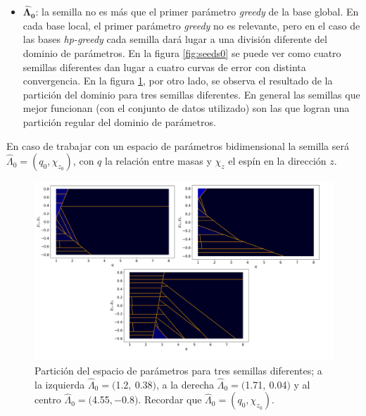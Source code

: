 \begin{itemize}
\item $\bm{\hat{\Lambda}_0}$: la semilla no es más que el primer parámetro \textit{greedy} de la base global. En cada base local, el primer parámetro \textit{greedy} no es relevante, pero en el caso de las bases \textit{hp-greedy} cada semilla dará lugar a una división diferente del dominio de parámetros. En la figura \ref{fig:seeds0} se puede ver como cuatro semillas diferentes dan lugar a cuatro curvas de error con distinta convergencia. En la figura \ref{fig:seeds_part}, por otro lado, se observa el resultado de la partición del dominio para tres semillas diferentes. En general las semillas que mejor funcionan (con el conjunto de datos utilizado) son las que logran una partición regular del dominio de parámetros. 
\end{itemize}

En caso de trabajar con un espacio de parámetros bidimensional la semilla será $\hat{\Lambda}_0 = (q_0, \chi_{z_0})$,  con $q$ la relación entre masas y $\chi_z$ el espín en la dirección $z$. 

\begin{figure}[h!]
\centering
\includegraphics[width=1.05\columnwidth ,trim={1.1cm, 1cm, 1cm, 1.2cm}]{figs/3_semillas_particion.png}
\caption{Partición del espacio de parámetros para tres semillas diferentes; a la izquierda $\hat{\Lambda}_0 = ($1.2$,\  $0.38$)$, a la derecha $\hat{\Lambda}_0 = ($1.71$,\  $0.04$)$ y al centro $\hat{\Lambda}_0 =($4.55$,  -$0.8$)$. Recordar que $\hat{\Lambda}_0 = (q_0, \chi_{z_0})$.}
\label{fig:seeds_part}
\end{figure}